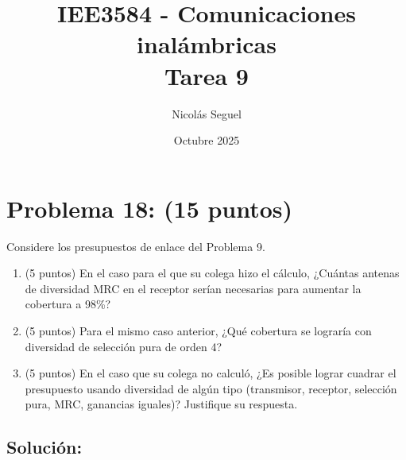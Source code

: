 \documentclass[11pt]{article}
\title{IEE3584 - Comunicaciones inalámbricas \\
Tarea 9}
\author{Nicolás Seguel}
\date{Octubre 2025}
\begin{document}
\maketitle

\section*{Problema 18: (15 puntos)}

Considere los presupuestos de enlace del Problema 9.

\begin{enumerate}
    \item (5 puntos) En el caso para el que su colega hizo el cálculo, ¿Cuántas antenas de diversidad MRC en el receptor serían necesarias para aumentar la cobertura a 98\%?
    \item (5 puntos) Para el mismo caso anterior, ¿Qué cobertura se lograría con diversidad de selección pura de orden 4?
    \item (5 puntos) En el caso que su colega no calculó, ¿Es posible lograr cuadrar el presupuesto usando diversidad de algún tipo (transmisor, receptor, selección pura, MRC, ganancias iguales)? Justifique su respuesta.
\end{enumerate}

\subsection*{Solución:}
\end{document}
